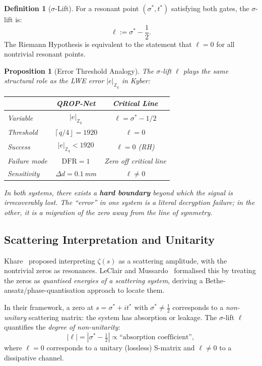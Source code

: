 \documentclass[11pt, a4paper]{article}
\theoremstyle{definition}
\newtheorem{definition}{Definition}[section]
\theoremstyle{plain}
\newtheorem{proposition}[theorem]{Proposition}
\newcommand{\Zq}{\mathbb{Z}_q}
\newcommand{\ceil}[1]{\left\lceil#1\right\rfloor}
\begin{document}
\begin{definition}[$\sigma$-Lift]
\label{def:sigma_lift}
For a resonant point $(\sigma^*, t^*)$ satisfying both gates, the
$\sigma$-lift is:
\begin{equation}
  \ell := \sigma^* - \frac{1}{2}.
  \label{eq:sigma_lift}
\end{equation}
The Riemann Hypothesis is equivalent to the statement that $\ell = 0$
for all nontrivial resonant points.
\end{definition}

\begin{proposition}[Error Threshold Analogy]
\label{prop:threshold}
The $\sigma$-lift $\ell$ plays the same structural role as the LWE
error $|e|_{\Zq}$ in Kyber:
\begin{center}
\begin{tabular}{lcc}
\toprule
& \textbf{QROP-Net} & \textbf{Critical Line} \\
\midrule
Variable        & $|e|_{\Zq}$            & $\ell = \sigma^* - 1/2$ \\
Threshold       & $\ceil{q/4} = 1920$    & $\ell = 0$ \\
Success         & $|e|_{\Zq} < 1920$     & $\ell = 0$ (RH) \\
Failure mode    & $\mathrm{DFR} = 1$     & Zero off critical line \\
Sensitivity     & $\Delta d = 0.1\,$mm   & $\ell \neq 0$ \\
\bottomrule
\end{tabular}
\end{center}
In both systems, there exists a \textbf{hard boundary} beyond which the
signal is irrecoverably lost. The ``error'' in one system is a literal
decryption failure; in the other, it is a migration of the zero away from
the line of symmetry.
\end{proposition}


\subsection{Scattering Interpretation and Unitarity}

Khare~\cite{khare1997} proposed interpreting $\zeta(s)$ as a scattering
amplitude, with the nontrivial zeros as resonances. LeClair and
Mussardo~\cite{leclair2023} formalised this by treating the zeros as
\textit{quantised energies of a scattering system}, deriving a
Bethe-ansatz/phase-quantisation approach to locate them.

In their framework, a zero at $s = \sigma^* + it^*$ with
$\sigma^* \neq \tfrac{1}{2}$ corresponds to a \textit{non-unitary}
scattering matrix: the system has absorption or leakage. The
$\sigma$-lift $\ell$ quantifies the \textit{degree of non-unitarity}:
\begin{equation}
  |\ell| = |\sigma^* - \tfrac{1}{2}| \propto
  \text{``absorption coefficient''},
  \label{eq:non_unitarity}
\end{equation}
where $\ell = 0$ corresponds to a unitary (lossless) S-matrix and
$\ell \neq 0$ to a dissipative channel.
\end{document}
